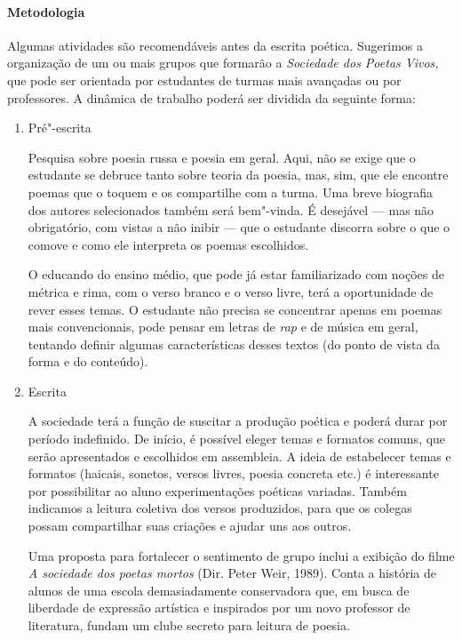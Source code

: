 \documentclass{article}
\begin{document}
\paragraph{Metodologia}

Algumas atividades são recomendáveis antes da escrita poética. Sugerimos
a organização de um ou mais grupos que formarão a \emph{Sociedade dos
Poetas Vivos,} que pode ser orientada por estudantes de turmas mais
avançadas ou por professores. A dinâmica de trabalho poderá ser dividida
da seguinte forma:

\begin{enumerate}
\item
Pré"-escrita

Pesquisa sobre poesia russa e poesia em geral. Aqui, não se exige que
o estudante se debruce tanto sobre teoria da poesia, mas, sim, que ele
encontre poemas que o toquem e os compartilhe com a turma. Uma breve
biografia dos autores selecionados também será bem"-vinda. É desejável
--- mas não obrigatório, com vistas a não inibir --- que o estudante
discorra sobre o que o comove e como ele interpreta os poemas
escolhidos.

O educando do ensino médio, que pode já estar familiarizado com noções
de métrica e rima, com o verso branco e o verso livre, terá a
oportunidade de rever esses temas. O estudante não precisa se concentrar
apenas em poemas mais convencionais, pode pensar em letras de \emph{rap}
e de música em geral, tentando definir algumas características desses
textos (do ponto de vista da forma e do conteúdo).

\item
Escrita

A sociedade terá a função de suscitar a produção poética e poderá durar
por período indefinido. De início, é possível eleger temas e formatos
comuns, que serão apresentados e escolhidos em assembleia. A ideia de
estabelecer temas e formatos (haicais, sonetos, versos livres, poesia
concreta etc.) é interessante por possibilitar ao aluno experimentações
poéticas variadas. Também indicamos a leitura coletiva dos versos
produzidos, para que os colegas possam compartilhar suas criações e
ajudar uns aos outros.

Uma proposta para fortalecer o sentimento de grupo inclui a exibição do
filme \emph{A sociedade dos poetas mortos} (Dir. Peter Weir, 1989).
Conta a história de alunos de uma escola demasiadamente conservadora
que, em busca de liberdade de expressão artística e inspirados por um
novo professor de literatura, fundam um clube secreto para leitura de
poesia.
\end{enumerate}
\end{document}
